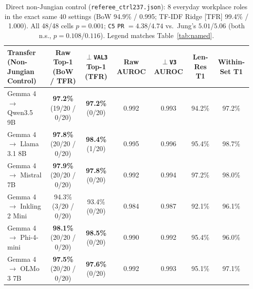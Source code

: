 \documentclass[conference]{IEEEtran}
\begin{document}
\begin{table}[t]
\centering
\caption{Direct non-Jungian control (\texttt{referee\_ctrl237.json}): 8 everyday workplace roles in the exact same 40 settings (BoW 94.9\% / 0.995; TF-IDF Ridge [TFR] 99.4\% / 1.000). All 48/48 cells $p=0.001$; \texttt{C5} \texttt{PR} $=4.38$/$4.74$ vs.\ Jung's $5.01$/$5.06$ (both n.s., $p=0.108$/$0.116$). Legend matches Table~\ref{tab:named}.}
\label{tab:nonjung}
\scriptsize
\setlength{\tabcolsep}{3.5pt}
\begin{tabular}{@{}lcccccc@{}}
\toprule
\textbf{Transfer (Non-Jungian Control)} & \textbf{Raw Top-1 (BoW / TFR)} & \textbf{$\perp$\texttt{VAL3} Top-1 (TFR)} & \textbf{Raw AUROC} & \textbf{$\perp$\texttt{V3} AUROC} & \textbf{Len-Res T1} & \textbf{Within-Set T1} \\
\midrule
Gemma 4 $\to$ Qwen3.5 9B & \textbf{97.2\%} (19/20 / 0/20) & \textbf{97.2\%} (0/20) & 0.992 & 0.993 & 94.2\% & 97.2\% \\
Gemma 4 $\to$ Llama 3.1 8B & \textbf{97.8\%} (20/20 / 0/20) & \textbf{98.4\%} (1/20) & 0.995 & 0.996 & 95.4\% & 98.7\% \\
Gemma 4 $\to$ Mistral 7B & \textbf{97.9\%} (20/20 / 0/20) & \textbf{97.8\%} (0/20) & 0.992 & 0.994 & 97.2\% & 98.0\% \\
Gemma 4 $\to$ Inkling 2 Mini & 94.3\% (3/20 / 0/20) & 93.4\% (0/20) & 0.984 & 0.987 & 92.1\% & 96.1\% \\
Gemma 4 $\to$ Phi-4-mini & \textbf{98.1\%} (20/20 / 0/20) & \textbf{98.5\%} (0/20) & 0.990 & 0.992 & 95.4\% & 96.0\% \\
Gemma 4 $\to$ OLMo 3 7B & \textbf{97.5\%} (20/20 / 0/20) & \textbf{97.6\%} (0/20) & 0.992 & 0.993 & 95.1\% & 97.1\% \\
\bottomrule
\end{tabular}
\end{table}
\end{document}
